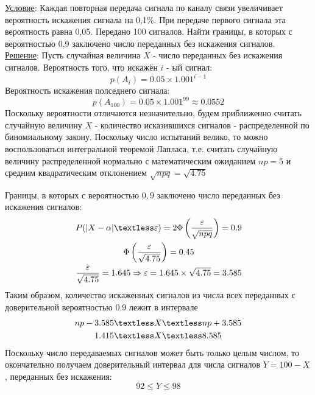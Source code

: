 \documentclass[a4paper,12pt]{article} %
\begin{document}
\underline{Условие}: Каждая повторная передача сигнала по каналу связи увеличивает
вероятность искажения сигнала на 0,1\%. При передаче первого сигнала эта
вероятность равна 0,05. Передано 100 сигналов. Найти границы, в которых с
вероятностью 0,9 заключено число переданных без искажения сигналов.\\
\underline{Решение}: Пусть случайная величина $X$ - число переданных без искажения сигналов. Вероятность того, что искажён $i$ - ый сигнал:
\[
	p(A_i) = 0.05\times 1.001^{i-1}
\]
Вероятность искажения полседнего сигнала:
\[
	p(A_{100}) = 0.05\times 1.001^{99}\approx 0.0552
\]
Поскольку вероятности отличаются незначительно, будем приближенно считать случайную величину $X$ - количество исказившихся сигналов - распределенной по
биномиальному закону. Поскольку число испытаний велико, то можно воспользоваться интегральной теоремой Лапласа, т.е. считать случайную величину
распределенной нормально с математическим ожиданием $np = 5$ и средним
квадратическим отклонением $\sqrt{npq} = \sqrt{4.75}$

Границы, в которых с вероятностью $0,9$ заключено число переданных без искажения сигналов:
\begin{gather}
	P(|X-\alpha|\textless\varepsilon) = 2\Phi\left(\dfrac{\varepsilon}{\sqrt{npq}}\right) = 0.9\\
	\Phi\left(\dfrac{\varepsilon}{\sqrt{4.75}}\right) = 0.45\\
	\dfrac{\varepsilon}{\sqrt{4.75}} = 1.645 \Rightarrow\varepsilon = 1.645\times\sqrt{4.75} = 3.585
\end{gather}
Таким образом, количество искаженных сигналов из числа всех переданных с доверительной вероятностью $0.9$ лежит в интервале
\begin{align}
	np - 3.585 \textless &X \textless np + 3.585\\
	1.415 \textless &X \textless 8.585
\end{align}
Поскольку число передаваемых сигналов может быть только целым числом, то окончательно получаем доверительный интервал для числа сигналов $Y = 100 - X$, переданных без искажения:
\[
	92 \leqslant Y \leqslant 98
\]
\end{document}
